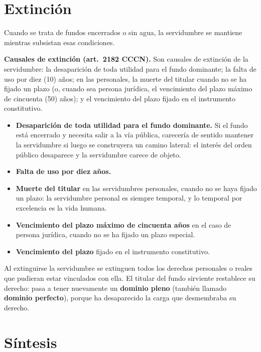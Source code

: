 \documentclass[12pt,oneside]{book}
\begin{document}
\section{Extinción}

Cuando se trata de fundos encerrados o sin agua, la servidumbre se mantiene mientras subsistan esas condiciones.

\begin{important}
\textbf{Causales de extinción (art.~2182 CCCN).} Son causales de extinción de la servidumbre: la desaparición de toda utilidad para el fundo dominante; la falta de uso por diez (10) años; en las personales, la muerte del titular cuando no se ha fijado un plazo (o, cuando sea persona jurídica, el vencimiento del plazo máximo de cincuenta (50) años); y el vencimiento del plazo fijado en el instrumento constitutivo.
\end{important}

\begin{itemize}
    \item \textbf{Desaparición de toda utilidad para el fundo dominante.} Si el fundo está encerrado y necesita salir a la vía pública, carecería de sentido mantener la servidumbre si luego se construyera un camino lateral: el interés del orden público desaparece y la servidumbre carece de objeto.
    \item \textbf{Falta de uso por diez años.}
    \item \textbf{Muerte del titular} en las servidumbres personales, cuando no se haya fijado un plazo: la servidumbre personal es siempre temporal, y lo temporal por excelencia es la vida humana.
    \item \textbf{Vencimiento del plazo máximo de cincuenta años} en el caso de persona jurídica, cuando no se ha fijado un plazo especial.
    \item \textbf{Vencimiento del plazo} fijado en el instrumento constitutivo.
\end{itemize}

Al extinguirse la servidumbre se extinguen todos los derechos personales o reales que pudieran estar vinculados con ella. El titular del fundo sirviente restablece su derecho: pasa a tener nuevamente un \textbf{dominio pleno} (también llamado \textbf{dominio perfecto}), porque ha desaparecido la carga que desmembraba su derecho.

\section{Síntesis}
\end{document}
